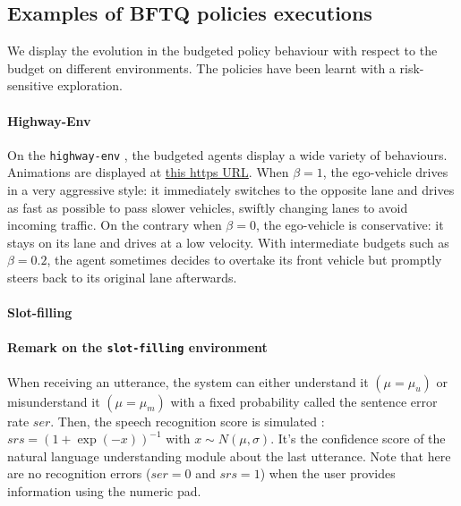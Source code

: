 \subsection{Examples of BFTQ policies executions}
\label{sec:bftq-executions}

We display the evolution in the budgeted policy behaviour with respect to the budget on different environments. The policies have been learnt with a risk-sensitive exploration.

\paragraph{Highway-Env}

On the \texttt{highway-env} , the budgeted agents display a wide variety of behaviours. Animations are displayed at  \href{https://budgeted-rl.github.io/\#driving-styles}{this https URL}. When $\beta = 1$, the ego-vehicle drives in a very aggressive style: it immediately switches to the opposite lane and drives as fast as possible to pass slower vehicles, swiftly changing lanes to avoid incoming traffic. On the contrary when $\beta = 0$, the ego-vehicle is conservative: it stays on its lane and drives at a low velocity. With intermediate budgets such as $\beta = 0.2$, the agent sometimes decides to overtake its front vehicle but promptly steers back to its original lane afterwards.

\paragraph{Slot-filling}

\paragraph{Remark on the \texttt{slot-filling} environment} When receiving an utterance, the system can either understand it $(\mu=\mu_u)$ or misunderstand it $(\mu=\mu_m)$ with a fixed probability called the sentence error rate $ser$. Then, the speech recognition score is simulated \citep{Khouzaimi2015}: $srs = (1+\exp(-x))^{-1}$ with $x\sim N(\mu, \sigma)$. It's the confidence score of the natural language understanding module about the last utterance. Note that here are no recognition errors ($ser=0$ and $srs=1$) when the user provides information using the numeric pad.

